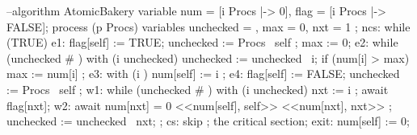 \documentclass[fleqn,leqno]{article}
\begin{document}
\begin{verbatim*}
--algorithm AtomicBakery 
{ variable num = [i \in Procs |-> 0], flag = [i \in Procs |-> FALSE];
  process (p \in Procs)
    variables unchecked = {}, max = 0, nxt = 1 ;
    { ncs: while (TRUE) 
            { e1:   flag[self] := TRUE;
                    unchecked := Procs \ {self} ;
                    max := 0;
              e2:   while (unchecked # {}) 
                      { with (i \in unchecked) 
                          { unchecked := unchecked \ {i};
                            if (num[i] > max) { max := num[i] }
                          }
                      };
              e3:   with (i ) { num[self] := i };
              e4:   flag[self] := FALSE;
                    unchecked := Procs \ {self} ;
              w1:   while (unchecked # {}) 
                      {     with (i \in unchecked) { nxt := i };
                            await ~ flag[nxt];
                        w2: await \/ num[nxt] = 0
                                  \/ <<num[self], self>> 
                                         \prec <<num[nxt], nxt>> ;
                            unchecked := unchecked \ {nxt};
                      } ;
              cs:   skip ;  \* the critical section;
              exit: num[self] := 0;
            }
    }
}
\end{verbatim*}
\end{document}
